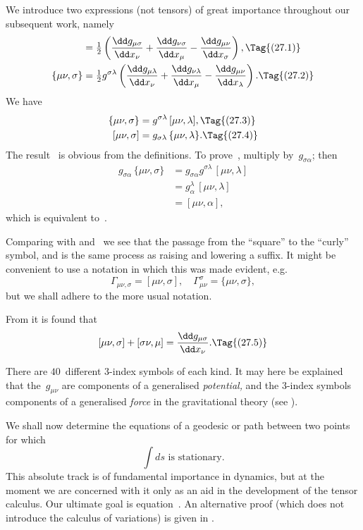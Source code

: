 \documentclass[12pt]{book}
\begin{document}
We introduce two expressions (not tensors) of great importance throughout
our subsequent work, namely
\begin{align*}
  [\mu\nu, \sigma]
  &= \tfrac{1}{2} \left(\frac{\dd g_{\mu\sigma}}{\dd x_{\nu}} + \frac{\dd g_{\nu\sigma}}{\dd x_{\mu}} - \frac{\dd g_{\mu\nu}}{\dd x_{\sigma}}\right),
  \Tag{(27.1)} \\
  \{\mu\nu, \sigma\}
  &= \tfrac{1}{2} g^{\sigma\lambda} \left(\frac{\dd g_{\mu\lambda}}{\dd x_{\nu}} + \frac{\dd g_{\nu\lambda}}{\dd x_{\mu}} - \frac{\dd g_{\mu\nu}}{\dd x_{\lambda}}\right).
\Tag{(27.2)}
\end{align*}
We have
\begin{align*}
  \{\mu\nu, \sigma\} &= g^{\sigma\lambda}\, [\mu\nu, \lambda],
  \Tag{(27.3)} \\
  [\mu\nu, \sigma] &= g_{\sigma\lambda}\, \{\mu\nu, \lambda\}.
  \Tag{(27.4)}
\end{align*}
The result~ is obvious from the definitions. To prove~, multiply 
by~$g_{\sigma\alpha}$; then
\begin{align*}
  g_{\sigma\alpha}\, \{\mu\nu, \sigma\}
  &= g_{\sigma\alpha} g^{\sigma\lambda}\, [\mu\nu, \lambda] \\
  &= g_{\alpha}^{\lambda}\, [\mu\nu, \lambda] \\
  &= [\mu\nu, \alpha],
\end{align*}
which is equivalent to~.

Comparing with  and~ we see that the passage from the
``square'' to the ``curly'' symbol, and  is the same process as raising
and lowering a suffix. It might be convenient to use a notation in which
this was made evident, e.g.\
\[
\Gamma_{\mu\nu, \sigma} = [\mu\nu, \sigma],\quad
\Gamma_{\mu\nu}^{\sigma} = \{\mu\nu, \sigma\},
\]
but we shall adhere to the more usual notation.

From  it is found that
\[
[\mu\nu, \sigma] + [\sigma\nu, \mu] = \frac{\dd g_{\mu\sigma}}{\dd x_{\nu}}.
\Tag{(27.5)}
\]

There are $40$~different $3$-index symbols of each kind. It may here be
explained that the~$g_{\mu\nu}$ are components of a generalised \emph{potential,} and the
\index{Potential!gravitational}%
$3$-index symbols components of a generalised \emph{force} in the gravitational
theory (see \SecRef{55}).


We shall now determine the equations of a geodesic or path between two
points for which
\[
\int ds \text{ is stationary.}
\]
This absolute track is of fundamental importance in dynamics, but at the
moment we are concerned with it only as an aid in the development of the
tensor calculus\footnotemark.\footnotetext
  {Our ultimate goal is equation~. An alternative proof (which does not introduce the
  calculus of variations) is given in \SecRef{31}.}
\end{document}

